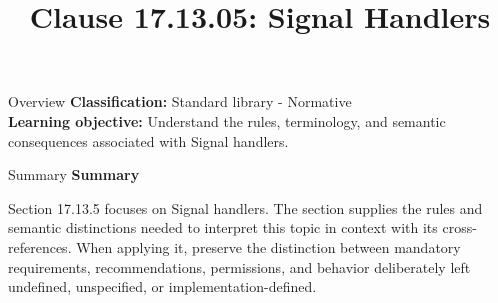 \documentclass[10pt,letterpaper]{article}
\title{Clause 17.13.05: Signal Handlers}
\author{}
\date{}
\begin{document}
\maketitle
\begin{CornellOverviewBox}{Overview}
\textbf{Classification:} Standard library - Normative\\[2pt]
\textbf{Learning objective:} Understand the rules, terminology, and semantic consequences associated with Signal handlers.
\end{CornellOverviewBox}\begin{CornellSummaryBox}{Summary}
{\sffamily\bfseries\color{Accent} Summary}\par\vspace{3pt}Section 17.13.5 focuses on Signal handlers. The section supplies the rules and semantic distinctions needed to interpret this topic in context with its cross-references. When applying it, preserve the distinction between mandatory requirements, recommendations, permissions, and behavior deliberately left undefined, unspecified, or implementation-defined.
\end{CornellSummaryBox}
\end{document}

